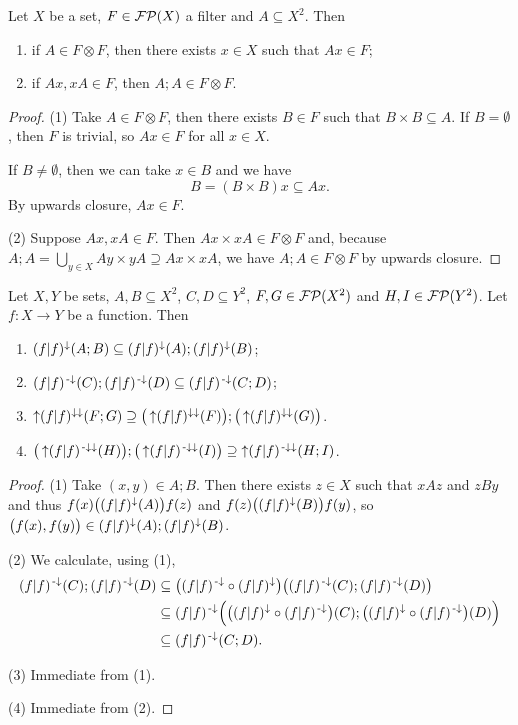 \begin{lemma} \label{principalImageOfInProductFilter}
Let $X$ be a set, $F\in \operatorname{\mathcal{FP}}(X)$ a filter and $A\subseteq X^2$. Then
\begin{enumerate}
\item if $A\in F\otimes F$, then there exists $x\in X$ such that $Ax\in F$;
\item if $Ax, xA\in F$, then $A;A \in F\otimes F$.
\end{enumerate}
\end{lemma}
\begin{proof}
(1) Take $A\in F\otimes F$, then there exists $B\in F$ such that $B\times B\subseteq A$. If $B = \emptyset$, then $F$ is trivial, so $Ax\in F$ for all $x\in X$.

If $B \neq \emptyset$, then we can take $x\in B$ and we have
\[ B = (B\times B)x \subseteq Ax. \]
By upwards closure, $Ax\in F$.

(2) Suppose $Ax, xA\in F$. Then $Ax\times xA \in F\otimes F$ and, because $A;A = \bigcup_{y\in X}Ay\times yA \supseteq Ax\times xA$, we have $A;A\in F\otimes F$ by upwards closure.
\end{proof}

\begin{proposition} \label{imageFilterComposition}
Let $X, Y$ be sets, $A,B\subseteq X^2$, $C,D\subseteq Y^2$, $F,G\in\operatorname{\mathcal{FP}}(X^2)$ and $H,I\in \operatorname{\mathcal{FP}}(Y^2)$. Let $f: X\to Y$ be a function. Then
\begin{enumerate}
\item $(f|f)^{\downarrow}(A;B) \subseteq (f|f)^{\downarrow}(A);(f|f)^\downarrow(B)$;
\item $(f|f)^{{\text{\hspace{0.15em}-}\downarrow}}(C);(f|f)^{\text{\hspace{0.15em}-}\downarrow}(D) \subseteq (f|f)^{{\text{\hspace{0.15em}-}\downarrow}}(C;D)$;
\item $\operatorname{\uparrow}(f|f)^{\downarrow\downarrow}(F;G) \supseteq \big(\operatorname{\uparrow}(f|f)^{\downarrow\downarrow}(F)\big);\big(\operatorname{\uparrow}(f|f)^{\downarrow\downarrow}(G)\big)$.
\item $\big(\operatorname{\uparrow}(f|f)^{{\text{\hspace{0.15em}-}\downarrow}\downarrow}(H)\big);\big(\operatorname{\uparrow}(f|f)^{{\text{\hspace{0.15em}-}\downarrow}\downarrow}(I)\big) \supseteq \operatorname{\uparrow}(f|f)^{{\text{\hspace{0.15em}-}\downarrow}\downarrow}(H;I)$.
\end{enumerate}
\end{proposition}
\begin{proof}
(1) Take $(x,y)\in A;B$. Then there exists $z\in X$ such that $xAz$ and $zBy$ and thus $f(x)\big((f|f)^{\downarrow}(A)\big)f(z)$ and $f(z)\big((f|f)^{\downarrow}(B)\big)f(y)$, so $\big(f(x), f(y)\big)\in (f|f)^{\downarrow}(A);(f|f)^\downarrow(B)$.

(2) We calculate, using (1),
\begin{align*}
(f|f)^{{\text{\hspace{0.15em}-}\downarrow}}(C);(f|f)^{\text{\hspace{0.15em}-}\downarrow}(D) &\subseteq \big((f|f)^{{\text{\hspace{0.15em}-}\downarrow}}\circ (f|f)^\downarrow\big)\big((f|f)^{{\text{\hspace{0.15em}-}\downarrow}}(C);(f|f)^{{\text{\hspace{0.15em}-}\downarrow}}(D)\big) \\
&\subseteq (f|f)^{{\text{\hspace{0.15em}-}\downarrow}}\Big(\big((f|f)^{\downarrow}\circ(f|f)^{{\text{\hspace{0.15em}-}\downarrow}}\big)(C);\big((f|f)^{\downarrow}\circ(f|f)^{{\text{\hspace{0.15em}-}\downarrow}}\big)(D)\Big) \\
&\subseteq (f|f)^{{\text{\hspace{0.15em}-}\downarrow}}(C;D).
\end{align*}

(3) Immediate from (1).

(4) Immediate from (2).
\end{proof}

